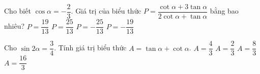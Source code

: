 \begin{ex}%
	Cho biết $\cos\alpha=-\dfrac{2}{3}$. Giá trị của  biểu thức $P=\dfrac{\cot\alpha+3\tan\alpha}{2\cot\alpha+\tan\alpha}$ bằng bao nhiêu?
	 \choice
		 {\True $P=\dfrac{19}{13}$}
		 {$P=\dfrac{25}{13}$}
		{$P=-\dfrac{25}{13}$} 
		{$P=-\dfrac{19}{13}$} 
\end{ex}

\begin{ex}%
	Cho $\sin 2\alpha =\dfrac {3}{4}$. Tính giá trị biểu thức  $A=\tan \alpha +\cot \alpha$.
	\choice 
		{$A=\dfrac  {4}{3}$}
		{$A=\dfrac {2}{3}$} 
		 {\True $A=\dfrac {8}{3}$}
		 {$A=\dfrac {16}{3}$}
\end{ex}

